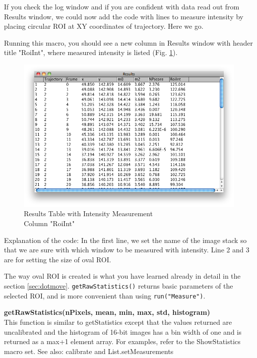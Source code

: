 \documentclass[11pt,a4paper,oneside]{report}
\newenvironment{indentCom}%
{\begin{list}{}%
         {\setlength{\leftmargin}{1em}}%
         \item[]%
}
{\end{list}}
\newcommand{\ilcom}[1]{\texttt{\small#1}}
\begin{document}
If you check the log window and if you are confident with data read out from Results window, we could now add the code with lines to measure intensity by placing circular ROI at XY coordinates of trajectory. Here we go. 



Running this macro, you should see a new column in Results window with header title "RoiInt", where measured intensity is listed (Fig. \ref{fig:PTResultsTableAfter}).

\begin{figure}[htbp]
\begin{center}
\includegraphics[scale=0.5]{fig/fig261_resultstableAddedWithInt.png}
\caption{Results Table with Intensity Measurement \\Column "RoiInt"}
\label{fig:PTResultsTableAfter}
\end{center}
\end{figure}

Explanation of the code: In the first line, we set the name of the image stack so that we are sure with which window to be measured with intensity. Line 2 and 3 are for setting the size of oval ROI. 

The way oval ROI is created is what you have learned already in detail in the section \ref{sec:dotmove}. \ilcom{getRawStatistics()} returns basic parameters of the selected ROI, and is more convenient than using \ilcom{run("Measure")}. 

\begin{indentCom}
\textbf{getRawStatistics(nPixels, mean, min, max, std, histogram)}\\
This function is similar to getStatistics except that the values returned are uncalibrated and the histogram of 16-bit images has a bin width of one and is returned as a max+1 element array. For examples, refer to the ShowStatistics macro set. See also: calibrate and List.setMeasurements
\end{indentCom} 
\end{document}
